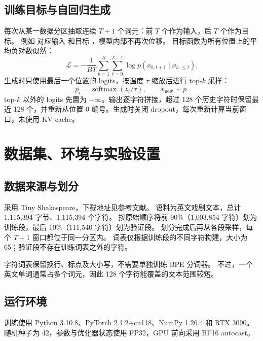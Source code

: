 \documentclass[UTF8,a4paper,zihao=-4,fontset=none]{ctexart}
\newcommand{\code}[1]{\texttt{\small\detokenize{#1}}}
\begin{document}
\subsection{训练目标与自回归生成}
每次从某一数据分区抽取连续 $T+1$ 个词元：前 $T$ 个作为输入，后 $T$ 个作为目标。
例如 \code{abcde} 对应输入 \code{abcd} 和目标 \code{bcde}，模型内部不再次位移。
目标函数为所有位置上的平均负对数似然：
\begin{equation}
\mathcal{L}=-\frac{1}{BT}\sum_{b=1}^{B}\sum_{t=0}^{T-1}
\log p(x_{b,t+1}\mid x_{b,\leq t}).
\end{equation}
生成时只使用最后一个位置的 logits，按温度 $\tau$ 缩放后进行 top-$k$ 采样：
\begin{equation}
p_i=\operatorname{softmax}\left(z_i/\tau\right),\qquad x_{\mathrm{new}}\sim p.
\end{equation}
top-$k$ 以外的 logits 先置为 $-\infty$。输出逐字符拼接，超过 128 个历史字符时保留最近
128 个，并重新从位置 0 编号。生成时关闭 dropout，每次重新计算当前窗口，未使用 KV cache。

\section{数据集、环境与实验设置}

\subsection{数据来源与划分}
采用 Tiny Shakespeare，下载地址见参考文献\cite{tinyshakespeare}。
语料为英文戏剧文本，总计 1,115,394 字节、1,115,394 个字符。
按原始顺序将前 90\%（1,003,854 字符）划为训练段，最后 10\%（111,540 字符）划为验证段。
划分完成后再从各段采样，每个 $T+1$ 窗口都位于同一分区内。
词表仅根据训练段的不同字符构建，大小为 65；验证段不存在训练词表之外的字符。

字符词表保留换行、标点及大小写，不需要单独训练 BPE 分词器。
不过，一个英文单词通常占多个词元，因此 128 个字符能覆盖的文本范围较短。

\subsection{运行环境}

训练使用 Python 3.10.8、PyTorch 2.1.2+cu118、NumPy 1.26.4 和 RTX 3090。随机种子为 42，参数与优化器状态使用 FP32，GPU 前向采用 BF16 autocast。
\end{document}
